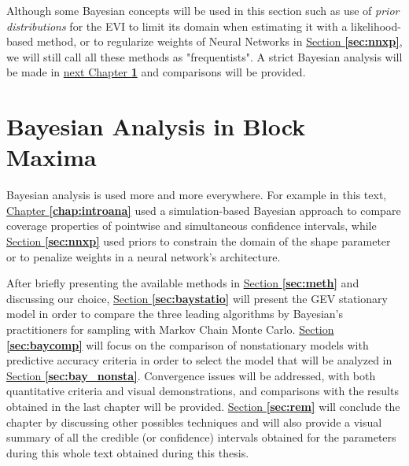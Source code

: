 \documentclass[11pt,a4paper,openany, twosided]{book}
\begin{document}
Although some Bayesian concepts will be used in this section such as use of \emph{prior distributions} for the EVI to limit its domain when estimating it with a likelihood-based method, or to regularize weights of Neural Networks in \hyperref[sec:nnxp]{Section \textbf{\ref{sec:nnxp}}}, we will still call all these methods as "frequentists".
A strict Bayesian analysis will be made in \hyperref[sec:anabayes]{next Chapter \textbf{\ref{sec:anabayes}}} and comparisons will be provided.

\newpage

\chapter{Bayesian Analysis in Block Maxima}\label{sec:anabayes}
\minitoc \thispagestyle{empty}
 \vspace{1cm}
 
Bayesian analysis is used more and more everywhere. For example in this text,  \hyperref[chap:introana]{Chapter \textbf{\ref{chap:introana}}} used a simulation-based Bayesian approach to compare coverage properties of pointwise and simultaneous confidence intervals, while \hyperref[sec:nnxp]{Section \textbf{\ref{sec:nnxp}}} used priors to constrain the domain of the shape parameter or to penalize weights in a neural network's architecture. %

After briefly presenting the available methods in \hyperref[sec:meth]{Section \textbf{\ref{sec:meth}}} and discussing our choice, \hyperref[sec:baystatio]{Section \textbf{\ref{sec:baystatio}}} will present the GEV stationary model in order to compare the three leading algorithms by Bayesian's practitioners for sampling with Markov Chain Monte Carlo. \hyperref[sec:baycomp]{Section \textbf{\ref{sec:baycomp}}} will focus on the comparison of nonstationary models with predictive accuracy criteria in order to select the model that will be analyzed in 
\hyperref[sec:bay_nonsta]{Section \textbf{\ref{sec:bay_nonsta}}}. Convergence issues will be addressed, with both quantitative criteria and visual demonstrations, and comparisons with the results obtained in the last chapter will be provided. 
\hyperref[sec:rem]{Section \textbf{\ref{sec:rem}}} will conclude the chapter by discussing other possibles techniques and will also provide a visual summary of all the credible (or confidence) intervals obtained for the parameters during this whole text obtained during this thesis.
\end{document}
